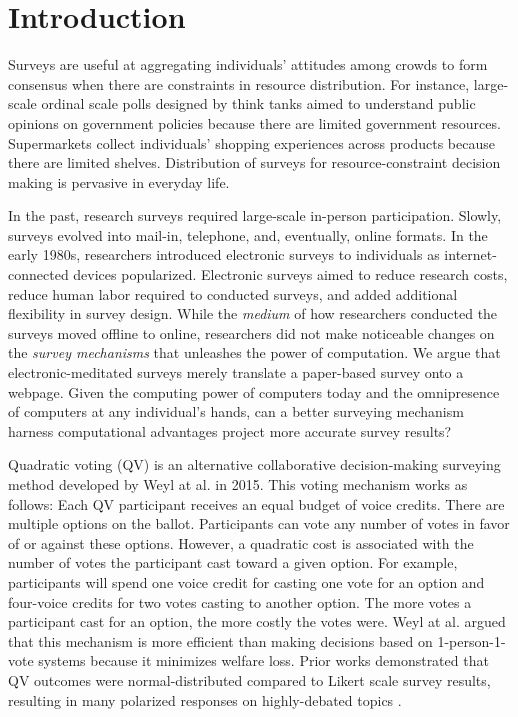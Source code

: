 \section{Introduction}

Surveys are useful at aggregating individuals' attitudes among crowds to form consensus when there are constraints in resource distribution. For instance, large-scale ordinal scale polls designed by think tanks aimed to understand public opinions on government policies \cite{pew} because there are limited government resources. Supermarkets collect individuals' shopping experiences across products because there are limited shelves. Distribution of surveys for resource-constraint decision making is pervasive in everyday life.

In the past, research surveys required large-scale in-person participation. Slowly, surveys evolved into mail-in, telephone, and, eventually, online formats. In the early 1980s, researchers introduced electronic surveys to individuals as internet-connected devices popularized. Electronic surveys aimed to reduce research costs, reduce human labor required to conducted surveys, and added additional flexibility in survey design. While the \textit{medium} of how researchers conducted the surveys moved offline to online, researchers did not make noticeable changes on the \textit{survey mechanisms} that unleashes the power of computation. We argue that electronic-meditated surveys merely translate a paper-based survey onto a webpage. Given the computing power of computers today and the omnipresence of computers at any individual's hands, can a better surveying mechanism harness computational advantages project more accurate survey results?

Quadratic voting (QV) is an alternative collaborative decision-making surveying method developed by Weyl at al. \cite{posner2018radical} in 2015. This voting mechanism works as follows: Each QV participant receives an equal budget of voice credits. There are multiple options on the ballot. Participants can vote any number of votes in favor of or against these options. However, a quadratic cost is associated with the number of votes the participant cast toward a given option. For example, participants will spend one voice credit for casting one vote for an option and four-voice credits for two votes casting to another option. The more votes a participant cast for an option, the more costly the votes were. Weyl at al. argued that this mechanism is more efficient than making decisions based on 1-person-1-vote systems because it minimizes welfare loss. Prior works demonstrated that QV outcomes were normal-distributed compared to Likert scale survey results, resulting in many polarized responses on highly-debated topics \cite{quarfoot2017quadratic}.

